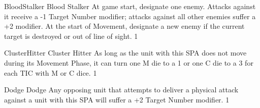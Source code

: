 %
%
%
%
%

\newcommand{\DeclareSPA}[4]{%
  \expandafter\def\csname #1\endcsname{#1}%
  \expandafter\def\csname SPAName#1\endcsname{#3}%
  \expandafter\def\csname SPAText#1\endcsname{#4}%
  \expandafter\def\csname SPASlot#1\endcsname{#2}%
}

\newcommand{\SPAName}[1]{%
  \ifcsname SPAName#1\endcsname
    \csname SPAName#1\endcsname
  \else
    Unbekannte SPA: #1%
  \fi
}

\newcommand{\SPAText}[1]{%
  \ifcsname SPAText#1\endcsname
    \csname SPAText#1\endcsname
  \else
    Für diese SPA wurde noch keine Beschreibung hinterlegt.%
  \fi
}

\newcommand{\SPASlot}[1]{%
  \ifcsname SPASlot#1\endcsname
    \csname SPASlot#1\endcsname
  \else
    ?%
  \fi
}


\DeclareSPA{BloodStalker}{1}{Blood Stalker}{%
At game start, designate one enemy. Attacks against it receive a -1 Target Number modifier; attacks against all other enemies suffer a +2 modifier. At the start of Movement, designate a new enemy if the current target is destroyed or out of line of sight.%
}

\DeclareSPA{ClusterHitter}{1}{Cluster Hitter}{%
As long as the unit with this SPA does not move during its Movement Phase, it can turn one M die to a 1 or one C die to a 3 for each TIC with M or C dice.%
}

\DeclareSPA{Dodge}{1}{Dodge}{%
Any opposing unit that attempts to deliver a physical attack against a unit with this SPA will suffer a +2 Target Number modifier.%
}

